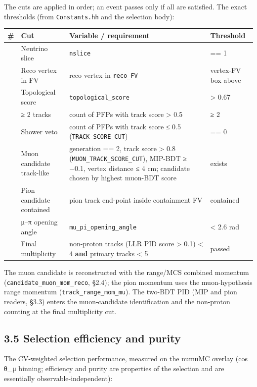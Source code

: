 \documentclass[11pt]{article}
\begin{document}
The cuts are applied in order; an event passes only if all are satisfied. The exact thresholds (from \texttt{Constants.hh} and the selection body):

\begin{tabularx}{\textwidth}{|>{\raggedright\arraybackslash}X|>{\raggedright\arraybackslash}X|>{\raggedright\arraybackslash}X|>{\raggedright\arraybackslash}X|}
\hline
\textbf{\#} & \textbf{Cut} & \textbf{Variable / requirement} & \textbf{Threshold} \\
\hline
1 & Neutrino slice & \texttt{nslice} & == 1 \\
2 & Reco vertex in FV & reco vertex in \texttt{reco\_FV} & vertex-FV box above \\
3 & Topological score & \texttt{topological\_score} & > 0.67 \\
4 & ≥ 2 tracks & count of PFPs with track score > 0.5 & ≥ 2 \\
5 & Shower veto & count of PFPs with track score ≤ 0.5 (\texttt{TRACK\_SCORE\_CUT}) & == 0 \\
6 & Muon candidate track-like & generation == 2, track score > 0.8 (\texttt{MUON\_TRACK\_SCORE\_CUT}), MIP-BDT ≥ −0.1, vertex distance ≤ 4 cm; candidate chosen by highest muon-BDT score & exists \\
7 & Pion candidate contained & pion track end-point inside containment FV & contained \\
8 & μ–π opening angle & \texttt{mu\_pi\_opening\_angle} & < 2.6 rad \\
9 & Final multiplicity & non-proton tracks (LLR PID score > 0.1) < 4 \textbf{and} primary tracks < 5 & passed \\
\hline
\end{tabularx}

The muon candidate is reconstructed with the range/MCS combined momentum (\texttt{candidate\_muon\_mom\_reco}, §2.4); the pion momentum uses the muon-hypothesis range momentum (\texttt{track\_range\_mom\_mu}). The two-BDT PID (MIP and pion readers, §3.3) enters the muon-candidate identification and the non-proton counting at the final multiplicity cut.

\subsection*{3.5 Selection efficiency and purity}

The CV-weighted selection performance, measured on the numuMC overlay (cos θ\_μ binning; efficiency and purity are properties of the selection and are essentially observable-independent):
\end{document}
